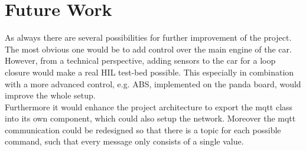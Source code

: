 \section{Future Work}
As always there are several possibilities for further improvement of the project.
The most obvious one would be to add control over the main engine of the car.
However, from a technical perspective, adding sensors to the car for a loop closure would make a real HIL test-bed possible.
This especially in combination with a more advanced control, e.g. ABS, implemented on the panda board, would improve the whole setup. \\

Furthermore it would enhance the project architecture to export the mqtt class into its own component, which could also setup the network.
Moreover the mqtt communication could be redesigned so that there is a topic for each possible command, such that every message only consists of a single value.
